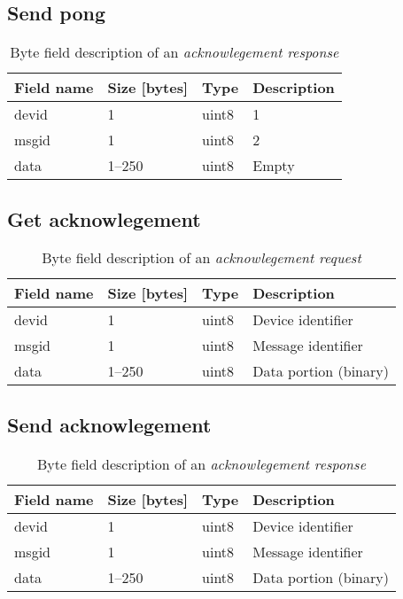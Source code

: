 \subsection{Send pong}
\begin{table}[h]
	\centering
	\begin{tabular}{llll}
		\toprule
		\textbf{Field name} & \textbf{Size [bytes]} & \textbf{Type} & \textbf{Description}\\
		\midrule
		devid & 1 & uint8 & 1 \\
		msgid & 1 & uint8 & 2 \\
		data & 1--250 & uint8 & Empty\\
		\bottomrule
	\end{tabular}
	\caption{Byte field description of an \textit{acknowlegement response}}
	\label{tab:ack}
\end{table}

\subsection{Get acknowlegement}
\begin{table}[h]
	\centering
	\begin{tabular}{llll}
		\toprule
		\textbf{Field name} & \textbf{Size [bytes]} & \textbf{Type} & \textbf{Description}\\
		\midrule
		devid & 1 & uint8 & Device identifier \\
		msgid & 1 & uint8 & Message identifier \\
		data & 1--250 & uint8 & Data portion (binary)\\
		\bottomrule
	\end{tabular}
	\caption{Byte field description of an \textit{acknowlegement request}}
	\label{tab:ack}
\end{table}

\subsection{Send acknowlegement}
\begin{table}[h]
	\centering
	\begin{tabular}{llll}
		\toprule
		\textbf{Field name} & \textbf{Size [bytes]} & \textbf{Type} & \textbf{Description}\\
		\midrule
		devid & 1 & uint8 & Device identifier \\
		msgid & 1 & uint8 & Message identifier \\
		data & 1--250 & uint8 & Data portion (binary)\\
		\bottomrule
	\end{tabular}
	\caption{Byte field description of an \textit{acknowlegement response}}
	\label{tab:ack}
\end{table}

